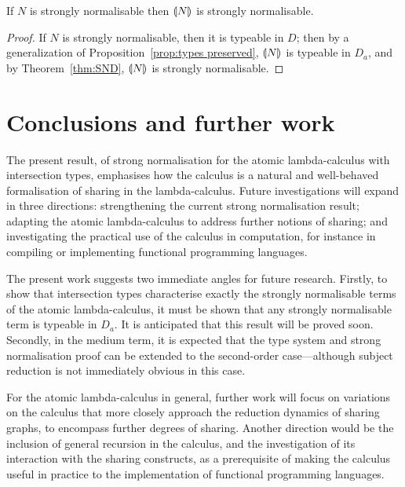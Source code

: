 \documentclass{llncs} %
\begin{document}
\begin{theorem}[PSN]
If $N$ is strongly normalisable then ${\llparenthesis{N}\rrparenthesis_{{}}}$ is strongly normalisable.
\end{theorem}

\begin{proof}
If $N$ is strongly normalisable, then it is typeable in $D$; then by a generalization of Proposition~\ref{prop:types preserved}, ${\llparenthesis{N}\rrparenthesis_{{}}}$ is typeable in $D_a$, and by Theorem~\ref{thm:SND}, ${\llparenthesis{N}\rrparenthesis_{{}}}$ is strongly normalisable.
\end{proof}

\section{Conclusions and further work}



The present result, of strong normalisation for the atomic lambda-calculus with intersection types, emphasises how the calculus is a natural and well-behaved formalisation of sharing in the lambda-calculus.
%
Future investigations will expand in three directions: strengthening the current strong normalisation result; adapting the atomic lambda-calculus to address further notions of sharing; and investigating the practical use of the calculus in computation, for instance in compiling or implementing functional programming languages.



The present work suggests two immediate angles for future research.
%
Firstly, to show that intersection types characterise exactly the strongly normalisable terms of the atomic lambda-calculus, it must be shown that any strongly normalisable term is typeable in $D_a$.
%
It is anticipated that this result will be proved soon.
%
Secondly, in the medium term, it is expected that the type system and strong normalisation proof can be extended to the second-order case---although subject reduction is not immediately obvious in this case.


For the atomic lambda-calculus in general, further work will focus on variations on the calculus that more closely approach the reduction dynamics of sharing graphs, to encompass further degrees of sharing.
%
Another direction would be the inclusion of general recursion in the calculus, and the investigation of its interaction with the sharing constructs, as a prerequisite of making the calculus useful in practice to the implementation of functional programming languages.
\end{document}
